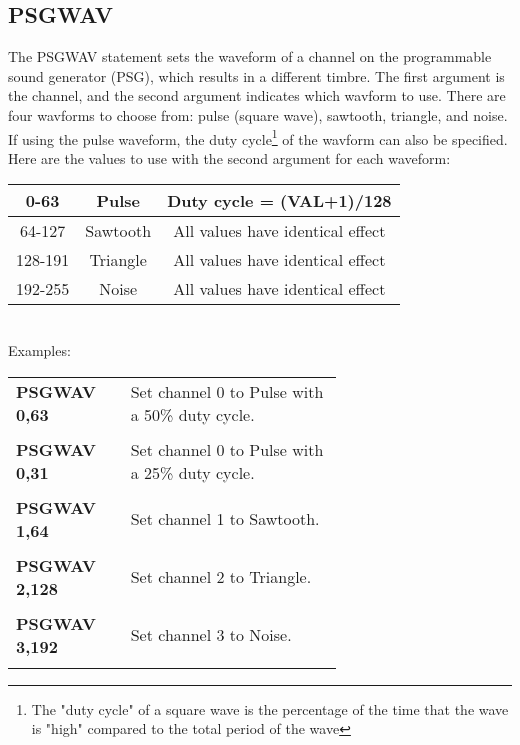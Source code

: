 \subsection{PSGWAV}

The {\ttfamily PSGWAV} statement sets the waveform of a channel on the
programmable sound generator (PSG), which results in a different timbre.  The
first argument is the channel, and the second argument indicates which wavform
to use.  There are four wavforms to choose from: pulse (square wave), sawtooth,
triangle, and noise.  If using the pulse waveform, the duty cycle\footnote{The
"duty cycle" of a square wave is the percentage of the time that the wave is
"high" compared to the total period of the wave} of the wavform can also be
specified.  Here are the values to use with the second argument for each
waveform:\\

\begin{tabular}{|c|c|c|}
	\hline

	0-63 & Pulse &Duty cycle = {\ttfamily (VAL+1)/128}\\ \hline

	64-127 & Sawtooth & All values have identical effect\\ \hline

	128-191 & Triangle & All values have identical effect\\ \hline

	192-255 & Noise & All values have identical effect\\ \hline

\end{tabular}\\

Examples:\\

\begin{tabular}{l p{0.65\linewidth}}

	{\ttfamily\bfseries PSGWAV 0,63}&Set channel 0 to Pulse with a 50\% duty cycle.\\\\

	{\ttfamily\bfseries PSGWAV 0,31}&Set channel 0 to Pulse with a 25\% duty cycle.\\\\

	{\ttfamily\bfseries PSGWAV 1,64}&Set channel 1 to Sawtooth.\\\\

	{\ttfamily\bfseries PSGWAV 2,128}&Set channel 2 to Triangle.\\\\

	{\ttfamily\bfseries PSGWAV 3,192}&Set channel 3 to Noise.\\\\

\end{tabular}

